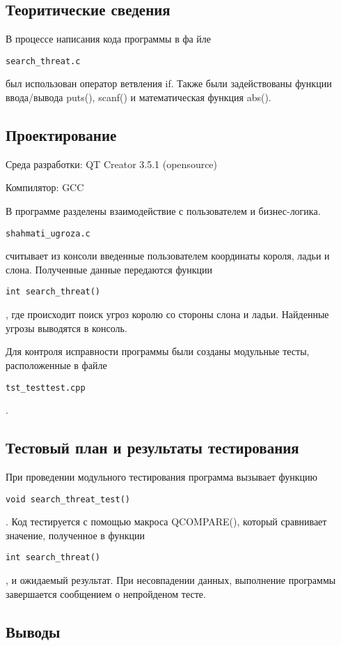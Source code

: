 \documentclass[12pt,a4paper]{report}
\begin{document}
\subsection{Теоритические сведения}
В процессе написания кода программы в фа	йле \begin{verbatim}search_threat.c\end{verbatim} был использован оператор ветвления if. Также были задействованы функции ввода/вывода puts(), scanf() и математическая функция abs().

\subsection{Проектирование}
Среда разработки: QT Creator 3.5.1 (opensource)

Компилятор: GCC

В программе разделены взаимодействие с пользователем и бизнес-логика. \begin{verbatim}shahmati_ugroza.c \end{verbatim} считывает из консоли введенные пользователем координаты короля, ладьи и слона. Полученные данные передаются функции \begin{verbatim}int search_threat() \end{verbatim}, где происходит поиск угроз королю со стороны слона и ладьи. Найденные угрозы выводятся в консоль.

Для контроля исправности программы были созданы модульные тесты, расположенные в файле \begin{verbatim}tst_testtest.cpp \end{verbatim}.

 
\subsection{Тестовый план и результаты тестирования}

При проведении модульного тестирования программа вызывает функцию \begin{verbatim}void search_threat_test() \end{verbatim}. Код тестируется с помощью макроса QCOMPARE(), который сравнивает значение, полученное в функции \begin{verbatim}int search_threat() \end{verbatim}, и ожидаемый результат. При несовпадении данных, выполнение программы завершается сообщением о непройденом тесте.

\subsection{Выводы}
\end{document}
